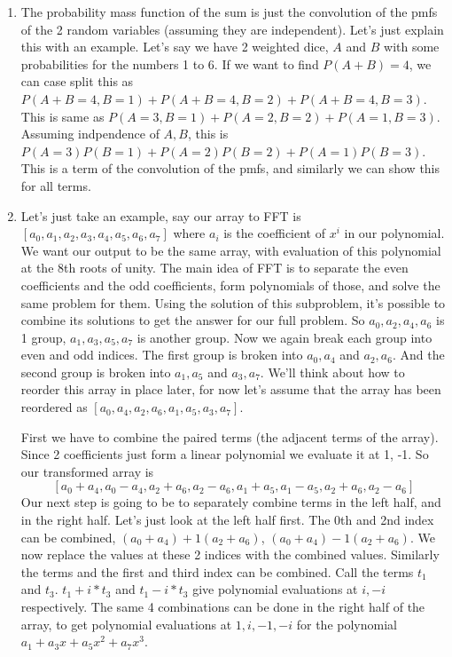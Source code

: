 \documentclass[12pt]{report}
\begin{document}
\begin{enumerate}[label=\textbf{\arabic*.}]
    \item The probability mass function of the sum is just the convolution of the pmfs of the 2 random variables (assuming they are independent).
    Let's just explain this with an example. Let's say we have 2 weighted dice, $A$ and $B$ with some probabilities for the numbers 1 to 6. If we 
    want to find $P(A+B) = 4$, we can case split this as $P(A+B=4, B=1) + P(A+B=4, B=2) + P(A+B=4, B=3)$. This is same as $P(A=3,B=1) + P(A=2,B=2)
    + P(A=1,B=3)$. Assuming indpendence of $A, B$, this is $P(A=3)P(B=1) + P(A=2)P(B=2) + P(A=1)P(B=3)$. This is a term of the convolution of the 
    pmfs, and similarly we can show this for all terms.

    \item Let's just take an example, say our array to FFT is $[a_0, a_1, a_2, a_3, a_4, a_5, a_6, a_7]$ where $a_i$ is the coefficient of $x^i$ in
    our polynomial. We want our output to be the same array, with evaluation of this polynomial at the 8th roots of unity. The main idea of FFT is to 
    separate the even coefficients and the odd coefficients, form polynomials of those, and solve the same problem for them. Using the solution of this
    subproblem, it's possible to combine its solutions to get the answer for our full problem. So $a_0, a_2, a_4, a_6$ is 1 group, $a_1, a_3, a_5, a_7$
    is another group. Now we again break each group into even and odd indices. The first group is broken into $a_0, a_4$ and $a_2, a_6$. And the second 
    group is broken into $a_1, a_5$ and $a_3, a_7$. We'll think about how to reorder this array in place later, for now let's assume that the array has 
    been reordered as $[a_0, a_4, a_2, a_6, a_1, a_5, a_3, a_7]$.

    First we have to combine the paired terms (the adjacent terms of the array). Since 2 coefficients just form a linear polynomial we evaluate it at 1, 
    -1. So our transformed array is 
    \[ [a_0 + a_4, a_0 - a_4, a_2 + a_6, a_2 - a_6, a_1 + a_5, a_1 - a_5, a_2 + a_6, a_2 - a_6] \]
    Our next step is going to be to separately combine terms in the left half, and in the right half. Let's just look at the left half first. The 0th and 
    2nd index can be combined, $(a_0 + a_4) + 1(a_2 + a_6)$, $(a_0 + a_4) - 1(a_2 + a_6)$. We now replace the values at these 2 indices with the combined
    values. Similarly the terms and the first and third index can be combined. Call the terms $t_1$ and $t_3$. $t_1 + i*t_3$ and $t_1 - i*t_3$ give 
    polynomial evaluations at $i, -i$ respectively. The same 4 combinations can be done in the right half of the array, to get polynomial evaluations at 
    $1, i, -1, -i$ for the polynomial $a_1 + a_3 x + a_5 x^2 + a_7 x^3$.


\end{enumerate}
\end{document}
